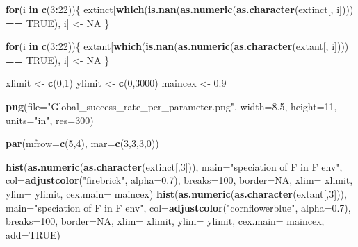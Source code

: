 \documentclass[]{book}
\newenvironment{Shaded}{\begin{snugshade}}{\end{snugshade}}
\newcommand{\KeywordTok}[1]{\textcolor[rgb]{0.13,0.29,0.53}{\textbf{{#1}}}}
\newcommand{\DataTypeTok}[1]{\textcolor[rgb]{0.13,0.29,0.53}{{#1}}}
\newcommand{\DecValTok}[1]{\textcolor[rgb]{0.00,0.00,0.81}{{#1}}}
\newcommand{\FloatTok}[1]{\textcolor[rgb]{0.00,0.00,0.81}{{#1}}}
\newcommand{\StringTok}[1]{\textcolor[rgb]{0.31,0.60,0.02}{{#1}}}
\newcommand{\OtherTok}[1]{\textcolor[rgb]{0.56,0.35,0.01}{{#1}}}
\newcommand{\ControlFlowTok}[1]{\textcolor[rgb]{0.13,0.29,0.53}{\textbf{{#1}}}}
\newcommand{\OperatorTok}[1]{\textcolor[rgb]{0.81,0.36,0.00}{\textbf{{#1}}}}
\newcommand{\NormalTok}[1]{{#1}}
\theoremstyle{definition}
\theoremstyle{definition}
\theoremstyle{definition}
\theoremstyle{remark}
\begin{document}
\begin{Shaded}
\begin{Highlighting}[]
\ControlFlowTok{for}\NormalTok{(i }\ControlFlowTok{in} \KeywordTok{c}\NormalTok{(}\DecValTok{3}\OperatorTok{:}\DecValTok{22}\NormalTok{))\{}
\NormalTok{    extinct[}\KeywordTok{which}\NormalTok{(}\KeywordTok{is.nan}\NormalTok{(}\KeywordTok{as.numeric}\NormalTok{(}\KeywordTok{as.character}\NormalTok{(extinct[, i]))) }\OperatorTok{==}\StringTok{ }\OtherTok{TRUE}\NormalTok{), i] <-}\StringTok{ }\OtherTok{NA}
\NormalTok{\}}

\ControlFlowTok{for}\NormalTok{(i }\ControlFlowTok{in} \KeywordTok{c}\NormalTok{(}\DecValTok{3}\OperatorTok{:}\DecValTok{22}\NormalTok{))\{}
\NormalTok{    extant[}\KeywordTok{which}\NormalTok{(}\KeywordTok{is.nan}\NormalTok{(}\KeywordTok{as.numeric}\NormalTok{(}\KeywordTok{as.character}\NormalTok{(extant[, i]))) }\OperatorTok{==}\StringTok{ }\OtherTok{TRUE}\NormalTok{), i] <-}\StringTok{ }\OtherTok{NA}
\NormalTok{\}}




\NormalTok{xlimit <-}\StringTok{ }\KeywordTok{c}\NormalTok{(}\DecValTok{0}\NormalTok{,}\DecValTok{1}\NormalTok{)}
\NormalTok{ylimit <-}\StringTok{ }\KeywordTok{c}\NormalTok{(}\DecValTok{0}\NormalTok{,}\DecValTok{3000}\NormalTok{)}
\NormalTok{maincex <-}\StringTok{ }\FloatTok{0.9}

\KeywordTok{png}\NormalTok{(}\DataTypeTok{file=}\StringTok{"Global_success_rate_per_parameter.png"}\NormalTok{, }\DataTypeTok{width=}\FloatTok{8.5}\NormalTok{, }\DataTypeTok{height=}\DecValTok{11}\NormalTok{, }\DataTypeTok{units=}\StringTok{"in"}\NormalTok{, }\DataTypeTok{res=}\DecValTok{300}\NormalTok{)}

\KeywordTok{par}\NormalTok{(}\DataTypeTok{mfrow=}\KeywordTok{c}\NormalTok{(}\DecValTok{5}\NormalTok{,}\DecValTok{4}\NormalTok{), }\DataTypeTok{mar=}\KeywordTok{c}\NormalTok{(}\DecValTok{3}\NormalTok{,}\DecValTok{3}\NormalTok{,}\DecValTok{3}\NormalTok{,}\DecValTok{0}\NormalTok{))}


\KeywordTok{hist}\NormalTok{(}\KeywordTok{as.numeric}\NormalTok{(}\KeywordTok{as.character}\NormalTok{(extinct[,}\DecValTok{3}\NormalTok{])), }\DataTypeTok{main=}\StringTok{"speciation of F in F env"}\NormalTok{, }\DataTypeTok{col=}\KeywordTok{adjustcolor}\NormalTok{(}\StringTok{"firebrick"}\NormalTok{, }\DataTypeTok{alpha=}\FloatTok{0.7}\NormalTok{), }\DataTypeTok{breaks=}\DecValTok{100}\NormalTok{, }\DataTypeTok{border=}\OtherTok{NA}\NormalTok{, }\DataTypeTok{xlim=}\NormalTok{ xlimit, }\DataTypeTok{ylim=}\NormalTok{ ylimit, }\DataTypeTok{cex.main=}\NormalTok{ maincex)}
\KeywordTok{hist}\NormalTok{(}\KeywordTok{as.numeric}\NormalTok{(}\KeywordTok{as.character}\NormalTok{(extant[,}\DecValTok{3}\NormalTok{])), }\DataTypeTok{main=}\StringTok{"speciation of F in F env"}\NormalTok{, }\DataTypeTok{col=}\KeywordTok{adjustcolor}\NormalTok{(}\StringTok{"cornflowerblue"}\NormalTok{, }\DataTypeTok{alpha=}\FloatTok{0.7}\NormalTok{), }\DataTypeTok{breaks=}\DecValTok{100}\NormalTok{, }\DataTypeTok{border=}\OtherTok{NA}\NormalTok{, }\DataTypeTok{xlim=}\NormalTok{ xlimit, }\DataTypeTok{ylim=}\NormalTok{ ylimit, }\DataTypeTok{cex.main=}\NormalTok{ maincex, }\DataTypeTok{add=}\OtherTok{TRUE}\NormalTok{)}



\end{Highlighting}
\end{Shaded}
\end{document}
